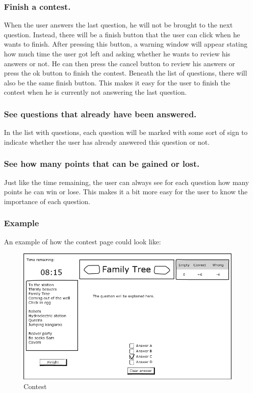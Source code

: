 \subsubsection*{Finish a contest.} 
When the user answers the last question, he will not be brought to the next question. Instead, there will be a finish button that the user can click when he wants to finish. After pressing this button, a warning window will appear stating how much time the user got left and asking whether he wants to review his answers or not. He can then press the cancel button to review his answers or press the ok button to finish the contest. Beneath the list of questions, there will also be the same finish button. This makes it easy for the user to finish the contest when he is currently not answering the last question. 

\subsubsection*{See questions that already have been answered.} 
In the list with questions, each question will be marked with some sort of sign to indicate whether the user has already answered this question or not. 

\subsubsection*{See how many points that can be gained or lost.}
Just like the time remaining, the user can always see for each question how many points he can win or lose. This makes it a bit more easy for the user to know the importance of each question. 

\subsubsection*{Example}
An example of how the contest page could look like: 
		\begin{figure}[h]
		  \centering
			\includegraphics[width=1\textwidth]{formal/img/contests.png}
		  \caption{Contest}
		  \label{Contest}
		\end{figure}

